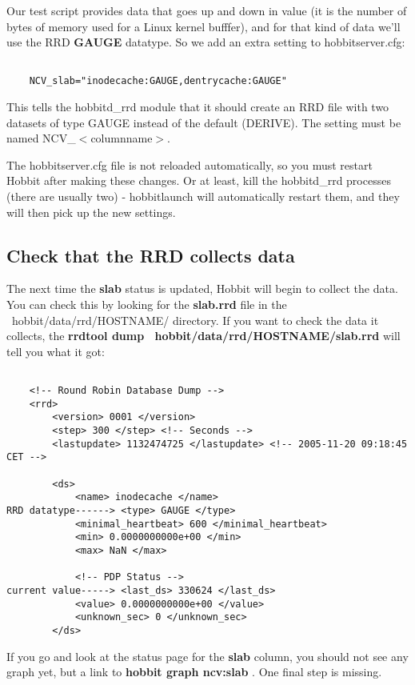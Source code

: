  Our test script provides data that goes up and down in value (it is the number of bytes of memory used for a Linux kernel bufffer), and for that kind of data we'll use the RRD \textbf{GAUGE}
 datatype. So we add an extra setting to hobbitserver.cfg:
\begin{verbatim}

	NCV_slab="inodecache:GAUGE,dentrycache:GAUGE"

\end{verbatim}


 This tells the hobbitd\_rrd module that it should create an RRD file with two datasets of type GAUGE instead of the default (DERIVE). The setting must be named NCV\_$<$columnname$>$.


 The hobbitserver.cfg file is not reloaded automatically, so you must restart Hobbit after making these changes. Or at least, kill the hobbitd\_rrd processes (there are usually two) - hobbitlaunch will automatically restart them, and they will then pick up the new settings.
\subsection{Check that the RRD collects data}


 The next time the \textbf{slab}
 status is updated, Hobbit will begin to collect the data. You can check this by looking for the \textbf{slab.rrd}
 file in the ~hobbit/data/rrd/HOSTNAME/ directory. If you want to check the data it collects, the \textbf{rrdtool dump ~hobbit/data/rrd/HOSTNAME/slab.rrd}
 will tell you what it got: \begin{verbatim}

	<!-- Round Robin Database Dump -->
	<rrd>
		<version> 0001 </version>
		<step> 300 </step> <!-- Seconds -->
		<lastupdate> 1132474725 </lastupdate> <!-- 2005-11-20 09:18:45 CET -->

		<ds>
			<name> inodecache </name>
RRD datatype------>	<type> GAUGE </type>
			<minimal_heartbeat> 600 </minimal_heartbeat>
			<min> 0.0000000000e+00 </min>
			<max> NaN </max>

			<!-- PDP Status -->
current value----->	<last_ds> 330624 </last_ds>
			<value> 0.0000000000e+00 </value>
			<unknown_sec> 0 </unknown_sec>
		</ds>

\end{verbatim}



 If you go and look at the status page for the \textbf{slab}
 column, you should not see any graph yet, but a link to \textbf{hobbit graph ncv:slab}
. One final step is missing.
